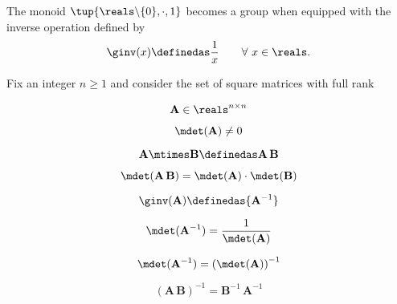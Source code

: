\begin{example}
The monoid $\tup{\reals \backslash \{ 0 \}, \cdot, 1}$ becomes a group when equipped with the inverse operation defined by
\begin{equation}
\ginv(x) \definedas \frac{1}{x} \quad \quad \forall \ x \in \reals.
\end{equation}
\end{example}



\begin{example}\label{exa:square-full}

Fix an integer $n\geq1 $ and consider the set of square matrices with full rank


\begin{equation} \label{eq:group-fullrank-issquare}
    \mathbf{A} \in \reals^{n\times n}
\end{equation}

\begin{equation} \label{eq:group-fullrank-isfullrank}
   \mdet(\mathbf{A}) \neq 0
\end{equation}


\begin{equation} \label{eq:group-fullrank-composition}
   \mathbf{A} \mtimes \mathbf{B}  \definedas \mathbf{A}\,\mathbf{B}
\end{equation}


\begin{equation} \label{eq:group-fullrank-composition-det}
   \mdet(\mathbf{A} \, \mathbf{B}) = \mdet(\mathbf{A}) \cdot  \mdet(\mathbf{B})
\end{equation}

\begin{equation} \label{eq:group-fullrank-inverse}
   \ginv(\mathbf{A}) \definedas {\mathbf{A}^{-1}}
\end{equation}


\begin{equation} \label{eq:group-fullrank-inverse-det}
   \mdet(\mathbf{A}^{-1}) = \frac{1}{\mdet(\mathbf{A})}
\end{equation}

\begin{equation} \label{eq:group-fullrank-inverse-det2}
   \mdet(\mathbf{A}^{-1}) = \left( \mdet(\mathbf{A}) \right) ^ {-1}
\end{equation}

\begin{equation} \label{eq:group-fullrank-inverse-comp}
   (\mathbf{A}\,\mathbf{B})^{-1} = {\mathbf{B}^{-1} \, \mathbf{A}^{-1}}
\end{equation}









\end{example}

